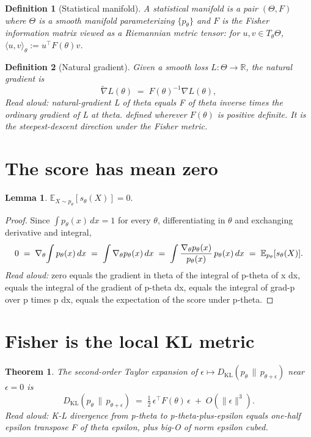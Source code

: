 \documentclass[11pt]{article}
\newtheorem{theorem}{Theorem}
\newtheorem{definition}{Definition}
\newtheorem{lemma}{Lemma}
\begin{document}
\begin{definition}[Statistical manifold]
A \emph{statistical manifold} is a pair $(\Theta, F)$ where $\Theta$ is a
smooth manifold parameterizing $\{p_\theta\}$ and $F$ is the Fisher information
matrix viewed as a Riemannian metric tensor: for $u, v \in T_\theta \Theta$,
$\langle u, v \rangle_\theta := u^\top F(\theta) v$.
\end{definition}

\begin{definition}[Natural gradient]
Given a smooth loss $L : \Theta \to \mathbb{R}$, the \emph{natural gradient} is
\[
\widetilde{\nabla} L(\theta) \;=\; F(\theta)^{-1} \nabla L(\theta),
\]
\emph{Read aloud:} natural-gradient L of theta equals F of theta inverse times the ordinary gradient of L at theta.
defined wherever $F(\theta)$ is positive definite. It is the steepest-descent
direction under the Fisher metric.
\end{definition}

\section{The score has mean zero}

\begin{lemma}\label{lem:score-mean}
$\mathbb{E}_{X \sim p_\theta}[s_\theta(X)] = 0.$
\end{lemma}

\begin{proof}
Since $\int p_\theta(x)\, dx = 1$ for every $\theta$, differentiating in $\theta$
and exchanging derivative and integral,
\[
0 \;=\; \nabla_\theta \!\int p_\theta(x)\, dx
  \;=\; \int \nabla_\theta p_\theta(x)\, dx
  \;=\; \int \frac{\nabla_\theta p_\theta(x)}{p_\theta(x)}\, p_\theta(x)\, dx
  \;=\; \mathbb{E}_{p_\theta}[s_\theta(X)]. \qedhere
\]
\emph{Read aloud:} zero equals the gradient in theta of the integral of p-theta of x dx, equals the integral of the gradient of p-theta dx, equals the integral of grad-p over p times p dx, equals the expectation of the score under p-theta.
\end{proof}

\section{Fisher is the local KL metric}

\begin{theorem}\label{thm:fisher-kl}
The second-order Taylor expansion of
$\epsilon \mapsto D_{\mathrm{KL}}(p_\theta \,\|\, p_{\theta + \epsilon})$ near
$\epsilon = 0$ is
\[
D_{\mathrm{KL}}\!\left(p_\theta \,\|\, p_{\theta + \epsilon}\right)
   \;=\; \tfrac{1}{2}\, \epsilon^\top F(\theta)\, \epsilon
   \;+\; O\!\left(\|\epsilon\|^3\right).
\]
\emph{Read aloud:} K-L divergence from p-theta to p-theta-plus-epsilon equals one-half epsilon transpose F of theta epsilon, plus big-O of norm epsilon cubed.
\end{theorem}
\end{document}
